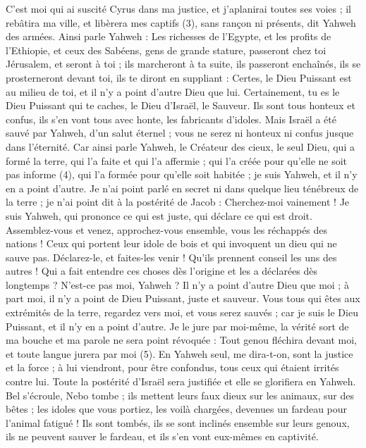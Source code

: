 \begin{multicols}{2}
{C'est moi qui ai suscité Cyrus dans ma justice, et j’aplanirai toutes ses voies ; il rebâtira ma ville, et libèrera mes captifs (3), sans rançon ni présents, dit Yahweh des armées.
Ainsi parle Yahweh : Les richesses de l'Egypte, et les profits de l’Ethiopie, et ceux des Sabéens, gens de grande stature, passeront chez toi Jérusalem, et seront à toi ; ils marcheront à ta suite, ils passeront enchaînés, ils se prosterneront devant toi, ils te diront en suppliant : Certes, le Dieu Puissant est au milieu de toi, et il n'y a point d'autre Dieu que lui.
Certainement, tu es le Dieu Puissant qui te caches, le Dieu d'Israël, le Sauveur.
Ils sont tous honteux et confus, ils s’en vont tous avec honte, les fabricants d’idoles.
Mais Israël a été sauvé par Yahweh, d'un salut éternel ; vous ne serez ni honteux ni confus jusque dans l’éternité.
Car ainsi parle Yahweh, le Créateur des cieux, le seul Dieu, qui a formé la terre, qui l'a faite et qui l'a affermie ; qui l’a créée pour qu’elle ne soit pas informe (4), qui l’a formée pour qu’elle soit habitée ; je suis Yahweh, et il n'y en a point d'autre.
Je n'ai point parlé en secret ni dans quelque lieu ténébreux de la terre ; je n'ai point dit à la postérité de Jacob : Cherchez-moi vainement ! Je suis Yahweh, qui prononce ce qui est juste, qui déclare ce qui est droit.
Assemblez-vous et venez, approchez-vous ensemble, vous les réchappés des nations ! Ceux qui portent leur idole de bois et qui invoquent un dieu qui ne sauve pas.
Déclarez-le, et faites-les venir ! Qu’ils prennent conseil les uns des autres ! Qui a fait entendre ces choses dès l’origine et les a déclarées dès longtemps ? N’est-ce pas moi, Yahweh ? Il n'y a point d'autre Dieu que moi ; à part moi, il n'y a point de Dieu Puissant, juste et sauveur.
Vous tous qui êtes aux extrémités de la terre, regardez vers moi, et vous serez sauvés ; car je suis le Dieu Puissant, et il n'y en a point d'autre.
Je le jure par moi-même, la vérité sort de ma bouche et ma parole ne sera point révoquée : Tout genou fléchira devant moi, et toute langue jurera par moi (5).
En Yahweh seul, me dira-t-on, sont la justice et la force ; à lui viendront, pour être confondus, tous ceux qui étaient irrités contre lui.
Toute la postérité d'Israël sera justifiée et elle se glorifiera en Yahweh.
\VerseOne{}Bel s’écroule, Nebo tombe ; ils mettent leurs faux dieux sur les animaux, sur des bêtes ; les idoles que vous portiez, les voilà chargées, devenues un fardeau pour l’animal fatigué !
Ils sont tombés, ils se sont inclinés ensemble sur leurs genoux, ils ne peuvent sauver le fardeau, et ils s’en vont eux-mêmes en captivité.
}
\end{multicols}
